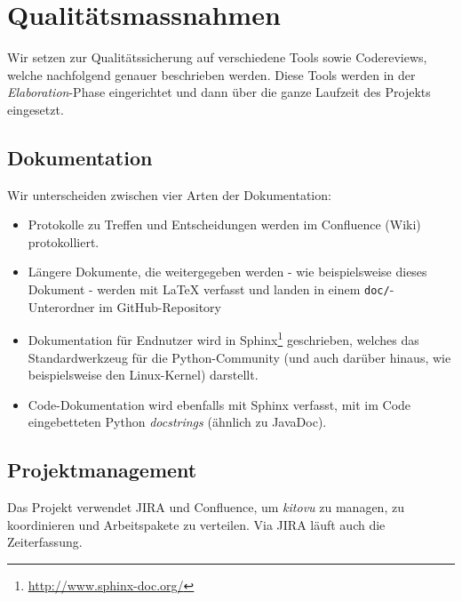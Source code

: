 \documentclass[a4paper]{article}
\let\oldsection\section
\renewcommand\section{\clearpage\oldsection}
\begin{document}
\section{Qualitätsmassnahmen}
%

Wir setzen zur Qualitätssicherung auf verschiedene Tools sowie Codereviews,
welche nachfolgend genauer beschrieben werden. Diese Tools werden in der
\emph{Elaboration}-Phase eingerichtet und dann über die ganze Laufzeit des Projekts
eingesetzt.

\subsection{Dokumentation}

Wir unterscheiden zwischen vier Arten der Dokumentation:

\begin{itemize}
  \item Protokolle zu Treffen und Entscheidungen werden im Confluence (Wiki) protokolliert.
  \item Längere Dokumente, die weitergegeben werden - wie beispielsweise dieses Dokument - werden mit \LaTeX{} verfasst und landen in einem
    \texttt{doc/}-Unterordner im GitHub-Repository
  \item Dokumentation für Endnutzer wird in
    Sphinx\footnote{\url{http://www.sphinx-doc.org/}} geschrieben, welches das
    Standardwerkzeug für die Python-Community (und auch darüber hinaus, wie
    beispielsweise den Linux-Kernel) darstellt.
  \item Code-Dokumentation wird ebenfalls mit Sphinx verfasst, mit im Code
    eingebetteten Python \emph{docstrings} (ähnlich zu JavaDoc).
\end{itemize}

\subsection{Projektmanagement}
Das Projekt verwendet JIRA und Confluence, um \emph{kitovu} zu managen, zu koordinieren und Arbeitspakete zu verteilen. Via JIRA läuft auch die Zeiterfassung.
\end{document}
